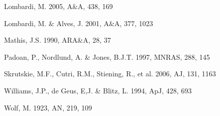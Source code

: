 \documentclass[useAMS,usenatbib]{mn2e}
\begin{document}
\begin{thebibliography}{}
Lombardi, M. 2005, A\&A, 438, 169

Lombardi, M. \& Alves, J. 2001, A\&A, 377, 1023

Mathis, J.S. 1990, ARA\&A, 28, 37

Padoan, P., Nordlund, A. \& Jones, B.J.T. 1997, MNRAS, 288, 145 



Skrutskie, M.F., Cutri, R.M., Stiening, R., et al. 2006, AJ, 131, 1163

Williams, J.P., de Geus, E,J. \& Blitz, L. 1994, ApJ, 428, 693

Wolf, M. 1923, AN, 219, 109 

\end{thebibliography}

\label{lastpage}

\end{document}
